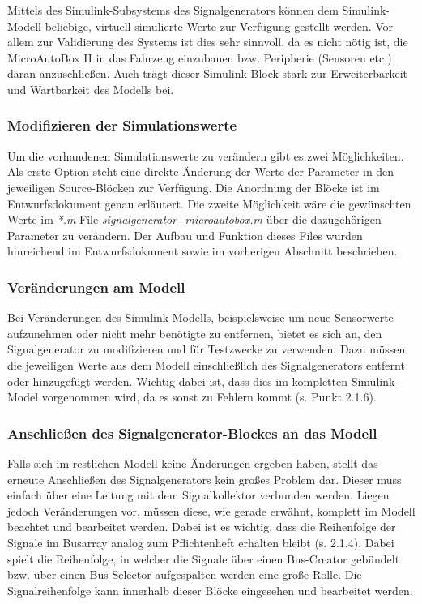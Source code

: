 \documentclass[fontsize = 12pt, paper = a4]{scrreprt}
\begin{document}
Mittels des Simulink-Subsystems des Signalgenerators können dem Simulink-Modell beliebige, virtuell simulierte Werte zur Verfügung gestellt werden. Vor allem zur Validierung des Systems ist dies sehr sinnvoll, da es nicht nötig ist, die MicroAutoBox II in das Fahrzeug einzubauen bzw. Peripherie (Sensoren etc.) daran anzuschließen. Auch trägt dieser Simulink-Block stark zur Erweiterbarkeit und Wartbarkeit des Modells bei.  

\subsubsection{Modifizieren der Simulationswerte}

Um die vorhandenen Simulationswerte zu verändern gibt es zwei Möglichkeiten. 
Als erste Option steht eine direkte Änderung der Werte  der Parameter in den jeweiligen Source-Blöcken zur Verfügung. 
Die Anordnung der Blöcke ist im Entwurfsdokument genau erläutert. 
Die zweite Möglichkeit wäre die gewünschten Werte im \textit{*.m}-File \textit{signalgenerator\_microautobox.m} über die dazugehörigen Parameter zu verändern. 
Der Aufbau und Funktion dieses Files wurden hinreichend im Entwurfsdokument sowie im vorherigen Abschnitt beschrieben.


\subsubsection{Veränderungen am Modell} 

Bei Veränderungen des Simulink-Modells, beispielsweise um neue Sensorwerte aufzunehmen oder nicht mehr benötigte zu entfernen, bietet es sich an, den Signalgenerator zu modifizieren und für Testzwecke zu verwenden. Dazu müssen die jeweiligen Werte aus dem Modell einschließlich des Signalgenerators entfernt oder hinzugefügt werden. Wichtig dabei ist, dass dies im kompletten Simulink-Model vorgenommen wird, da es sonst zu Fehlern kommt (s. Punkt 2.1.6). 


\subsubsection{Anschließen des Signalgenerator-Blockes an das Modell}

Falls sich im restlichen Modell keine Änderungen ergeben haben, stellt das erneute Anschließen des Signalgenerators kein großes Problem dar. 
Dieser muss einfach über eine Leitung mit dem Signalkollektor verbunden werden.  
Liegen jedoch Veränderungen vor, müssen diese, wie gerade erwähnt, komplett im Modell beachtet und bearbeitet werden. 
Dabei ist es wichtig, dass die Reihenfolge der Signale im Busarray analog zum Pflichtenheft erhalten bleibt (s. 2.1.4). 
Dabei spielt die Reihenfolge, in welcher die Signale über einen Bus-Creator gebündelt bzw. über einen Bus-Selector aufgespalten werden eine große Rolle. 
Die Signalreihenfolge kann innerhalb dieser Blöcke eingesehen und bearbeitet werden. 
\end{document}
